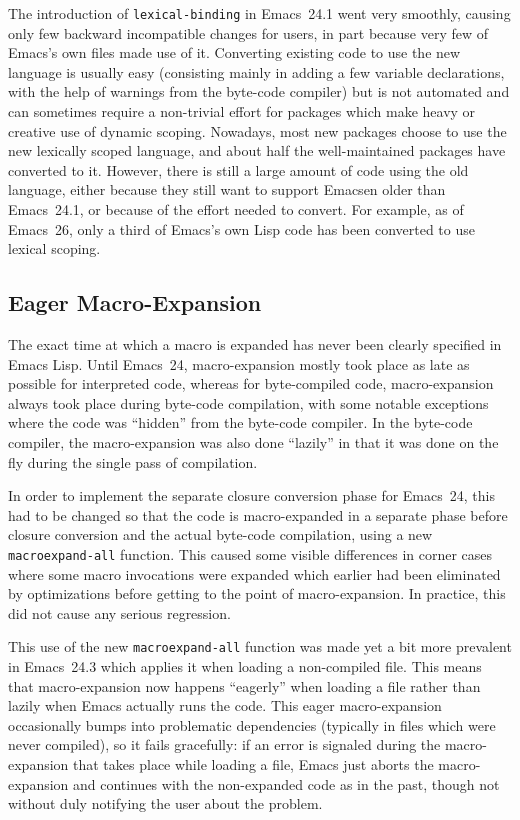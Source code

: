 \documentclass[format=acmsmall,screen]{acmart}
\newcommand \Elisp {Emacs Lisp}
\begin{document}
The introduction of \texttt{lexical-binding} in Emacs~24.1 went very smoothly,
causing only few backward incompatible changes for users, in part because
very few of Emacs's own files made use of it.  Converting existing code to
use the new language is usually easy (consisting mainly in adding a few
variable declarations, with the help of warnings from the byte-code compiler) but
is not automated and can sometimes require a non-trivial effort for packages
which make heavy or creative use of dynamic scoping.  Nowadays, most new
packages choose to use the new lexically scoped language, and about half the
well-maintained packages have converted to it.   However, there is still a large
amount of code using the old language, either because they still want to
support Emacsen older than Emacs~24.1, or because of the effort needed to
convert.  For example, as of Emacs~26, only a third of Emacs's own Lisp code
has been converted to use lexical scoping.


\subsection{Eager Macro-Expansion} %
\label{sec:eager-macro-expansion}

The exact time at which a macro is expanded has never been clearly specified
in \Elisp{}.  Until Emacs~24, macro-expansion mostly took place as late as
possible for interpreted code, whereas for byte-compiled code,
macro-expansion always took place during byte-code compilation, with some notable
exceptions where the code was ``hidden'' from the byte-code compiler.  In the
byte-code compiler, the macro-expansion was also done ``lazily'' in that it was
done on the fly during the single pass of compilation.

In order to implement the separate closure conversion phase for Emacs~24,
this had to be changed so that the code is macro-expanded in a separate
phase before closure conversion and the actual byte-code compilation, using a new
\texttt{macroexpand-all} function.
This caused some visible differences in corner cases where some macro
invocations were expanded which earlier had been eliminated by optimizations before
getting to the point of macro-expansion. In practice, this did not cause
any serious regression.

This use of the new \texttt{macroexpand-all} function was made yet a bit
more prevalent in Emacs~24.3 which applies it when loading
a non-compiled file.  This means that macro-expansion now happens ``eagerly'' when
loading a file rather than lazily when Emacs actually runs the code.  This eager
macro-expansion occasionally bumps into problematic dependencies (typically
in files which were never compiled), so it fails gracefully: if an
error is signaled during the macro-expansion that takes place while loading
a file, Emacs just aborts the macro-expansion and continues with the non-expanded
code as in the past, though not without duly notifying the user about
the problem.
\end{document}
